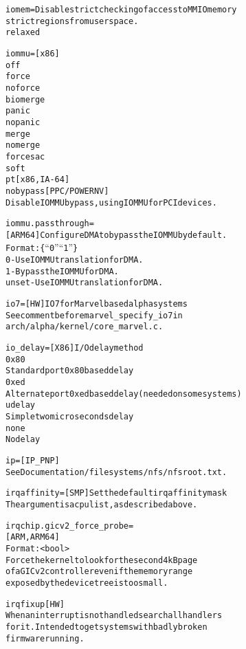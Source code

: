 \documentclass[a4paper,8pt,english]{sphinxmanual}
\begin{document}
\begin{alltt}
        iomem=          Disable strict checking of access to MMIO memory
                strict  regions from userspace.
                relaxed

        iommu=          {[}x86{]}
                off
                force
                noforce
                biomerge
                panic
                nopanic
                merge
                nomerge
                forcesac
                soft
                pt              {[}x86, IA-64{]}
                nobypass        {[}PPC/POWERNV{]}
                        Disable IOMMU bypass, using IOMMU for PCI devices.

        iommu.passthrough=
                        {[}ARM64{]} Configure DMA to bypass the IOMMU by default.
                        Format: \{ ``0'' \textbar{} ``1'' \}
                        0 - Use IOMMU translation for DMA.
                        1 - Bypass the IOMMU for DMA.
                        unset - Use IOMMU translation for DMA.

        io7=            {[}HW{]} IO7 for Marvel based alpha systems
                        See comment before marvel\_specify\_io7 in
                        arch/alpha/kernel/core\_marvel.c.

        io\_delay=       {[}X86{]} I/O delay method
                0x80
                        Standard port 0x80 based delay
                0xed
                        Alternate port 0xed based delay (needed on some systems)
                udelay
                        Simple two microseconds delay
                none
                        No delay

        ip=             {[}IP\_PNP{]}
                        See Documentation/filesystems/nfs/nfsroot.txt.

        irqaffinity=    {[}SMP{]} Set the default irq affinity mask
                        The argument is a cpu list, as described above.

        irqchip.gicv2\_force\_probe=
                        {[}ARM, ARM64{]}
                        Format: \textless{}bool\textgreater{}
                        Force the kernel to look for the second 4kB page
                        of a GICv2 controller even if the memory range
                        exposed by the device tree is too small.

        irqfixup        {[}HW{]}
                        When an interrupt is not handled search all handlers
                        for it. Intended to get systems with badly broken
                        firmware running.


\end{alltt}
\end{document}
